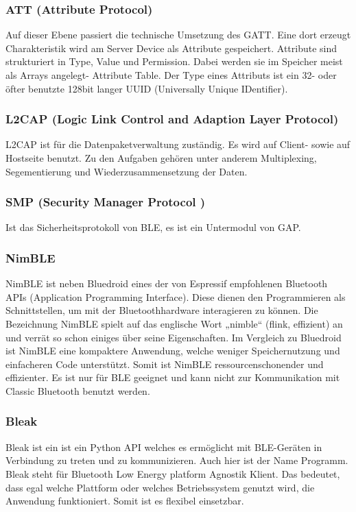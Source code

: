\subsubsection{ATT (Attribute Protocol)} \label{ATT}
Auf dieser Ebene passiert die technische Umsetzung des GATT.
Eine dort erzeugt Charakteristik wird am Server Device als Attribute gespeichert.
Attribute sind strukturiert in Type, Value und Permission. Dabei werden sie im Speicher meist als Arrays angelegt- Attribute Table.
Der Type eines Attributs ist ein 32- oder öfter benutzte 128bit langer UUID (Universally Unique IDentifier). \cite{espressif_ble_intro}

\subsubsection{L2CAP (Logic Link Control and Adaption Layer Protocol)}
L2CAP ist für die Datenpaketverwaltung zuständig. Es wird auf Client- sowie auf Hostseite benutzt.
Zu den Aufgaben gehören unter anderem Multiplexing, Segementierung und Wiederzusammensetzung der Daten. \cite{texas_ins_ble_l2cap}

\subsubsection{SMP (Security Manager Protocol )}
Ist das Sicherheitsprotokoll von BLE, es ist ein Untermodul von GAP. \cite{espressif_bluetooth_security}

\subsubsection{NimBLE} \label{NimBLE}
NimBLE ist neben Bluedroid eines der von Espressif empfohlenen Bluetooth APIs (Application Programming Interface).
Diese dienen den Programmieren als Schnittstellen, um mit der Bluetoothhardware interagieren zu können.
Die Bezeichnung NimBLE spielt auf das englische Wort „nimble“ (flink, effizient) an und verrät so schon einiges über seine Eigenschaften.
Im Vergleich zu Bluedroid ist NimBLE eine kompaktere Anwendung, welche weniger Speichernutzung und einfacheren Code unterstützt. Somit ist 
NimBLE ressourcenschonender und effizienter. Es ist nur für BLE geeignet und kann nicht zur Kommunikation mit Classic Bluetooth benutzt werden. \cite{espressif_nimble} \cite{apache_nimble}

\subsubsection{Bleak} \label{Bleak}
Bleak ist ein ist ein Python API welches es ermöglicht mit BLE-Geräten in Verbindung zu treten und zu kommunizieren.
Auch hier ist der Name Programm. Bleak steht für Bluetooth Low Energy platform Agnostik Klient. 
Das bedeutet, dass egal welche Plattform oder welches Betriebssystem genutzt wird, die Anwendung funktioniert. Somit ist es flexibel
einsetzbar. \cite{bleak_docu}

